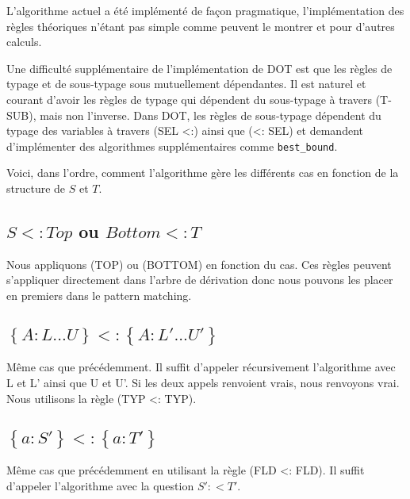 L'algorithme actuel a été implémenté de façon pragmatique, l'implémentation des
règles théoriques n'étant pas simple comme peuvent le montrer
\cite{tapl-metatheory-subtyping} et
\cite{tapl-bounded-quantification-metatheory} pour d'autres calculs.

Une difficulté supplémentaire de l'implémentation de DOT est que les règles de
typage et de sous-typage sous mutuellement dépendantes. Il est naturel et
courant d'avoir les règles de typage qui dépendent du sous-typage à travers
(T-SUB), mais non l'inverse. Dans DOT, les règles de sous-typage dépendent du
typage des variables à travers (SEL <:) ainsi que (<: SEL) et demandent
d'implémenter des algorithmes supplémentaires comme \verb|best_bound|.


Voici, dans l'ordre,
comment l'algorithme gère les différents cas en fonction de la structure de $S$
et $T$.

\subsection*{$S <: Top$ ou $Bottom <: T$}

Nous appliquons (TOP) ou (BOTTOM) en fonction du cas. Ces règles peuvent
s'appliquer directement dans l'arbre de dérivation donc nous pouvons les placer
en premiers dans le pattern matching.

\subsection*{$\left\{ A : L ... U \right\} <: \left\{ A : L' ... U' \right\}$}

Même cas que précédemment. Il suffit d'appeler récursivement l'algorithme avec L
et L' ainsi que U et U'. Si les deux appels renvoient vrais, nous renvoyons
vrai. Nous utilisons la règle (TYP <: TYP).

\subsection*{$\left\{ a : S' \right\} <: \left\{ a : T' \right\}$}

Même cas que précédemment en utilisant la règle (FLD <: FLD). Il suffit
d'appeler l'algorithme avec la question $S' :< T'$.

